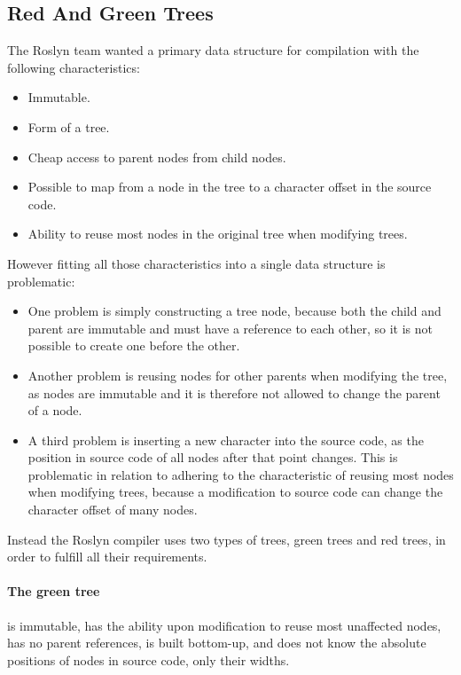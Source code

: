 \subsection{Red And Green Trees}
\label{subsec:roslyn_red_green_trees}
The Roslyn team wanted a primary data structure for compilation with the following characteristics\cite{lippert2012redgreen}:
\begin{itemize}
	\item Immutable.
	\item Form of a tree.
	\item Cheap access to parent nodes from child nodes.
	\item Possible to map from a node in the tree to a character offset in the source code.
	\item Ability to reuse most nodes in the original tree when modifying trees.
\end{itemize}
However fitting all those characteristics into a single data structure is problematic\cite{lippert2012redgreen}:
\begin{itemize}
\item One problem is simply constructing a tree node, because both the child and parent are immutable and must have a reference to each other, so it is not possible to create one before the other.
\item Another problem is reusing nodes for other parents when modifying the tree, as nodes are immutable and it is therefore not allowed to change the parent of a node. 
\item A third problem is inserting a new character into the source code, as the position in source code of all nodes after that point changes. This is problematic in relation to adhering to the characteristic of reusing most nodes when modifying trees, because a modification to source code can change the character offset of many nodes.
\end{itemize}

Instead the Roslyn compiler uses two types of trees, green trees and red trees, in order to fulfill all their requirements.

\paragraph{The green tree} is immutable, has the ability upon modification to reuse most unaffected nodes, has no parent references, is built bottom-up, and does not know the absolute positions of nodes in source code, only their widths\cite{lippert2012redgreen}.


